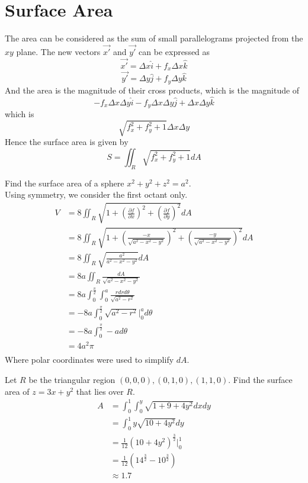 \documentclass[12pt]{article}
\begin{document}
\section{Surface Area}

The area can be considered as the sum of small parallelograms projected from the $xy$ plane. The new vectors $\vec{x'}$ and $\vec{y'}$ can be expressed as
$$\vec{x'} = \Delta x \hat{i} + f_x \Delta x \hat{k}$$
$$\vec{y'} = \Delta y \hat{j} + f_y \Delta y \hat{k}$$
And the area is the magnitude of their cross products, which is the magnitude of
$$-f_x \Delta x \Delta y \hat{i} - f_y \Delta x \Delta y \hat{j} + \Delta x \Delta y \hat{k}$$
which is
$$\sqrt{f_x^2 + f_y^2 + 1}\Delta x \Delta y$$
Hence the surface area is given by
$$S = \iint_R \sqrt{f_x^2 + f_y^2 + 1} dA$$

\begin{ex}
	Find the surface area of a sphere $x^2 + y^2 + z^2 = a^2$. \\
	Using symmetry, we consider the first octant only.
	\begin{align*}
	V &= 8 \iint_R \sqrt{1 + \left(\frac{\partial f}{\partial x}\right)^2 + \left(\frac{\partial f}{\partial y}\right)^2} dA \\
	  &= 8 \iint_R \sqrt{1 + \left(\frac{-x}{\sqrt{a^2-x^2-y^2}}\right)^2 + \left(\frac{-y}{\sqrt{a^2-x^2-y^2}}\right)^2} dA \\
	  &= 8 \iint_R \sqrt{\frac{a^2}{a^2-x^2-y^2}} dA \\
	  &= 8a \iint_R \frac{dA}{\sqrt{a^2-x^2-y^2}} \\
	  &= 8a \int_0^{\frac{\pi}{2}} \int_0^a \frac{rdrd\theta}{\sqrt{a^2-r^2}} \\
	  &= -8a \int_0^{\frac{\pi}{2}} \sqrt{a^2-r^2} \Big |_0^a d\theta \\
	  &= -8a \int_0^{\frac{\pi}{2}} -a d\theta \\
	  &= 4a^2\pi \\
\end{align*}
Where polar coordinates were used to simplify $dA$.
\end{ex}

\begin{ex}
	Let $R$ be the triangular region $(0,0,0), (0,1,0), (1,1,0)$. Find the surface area of $z = 3x + y^2$ that lies over $R$.
	\begin{align*}
		A &= \int_0^1 \int_0^y \sqrt{1 + 9 + 4y^2} dxdy \\
		  &= \int_0^1 y\sqrt{10+4y^2} dy \\
		  &= \frac{1}{12} (10+4y^2)^{\frac{3}{2}} \Big |_0^1 \\
		  &= \frac{1}{12}\left(14^{\frac{3}{2}} - 10^{\frac{3}{2}}\right) \\
		  &\approx 1.7 \\
	\end{align*}
\end{ex}
\end{document}
